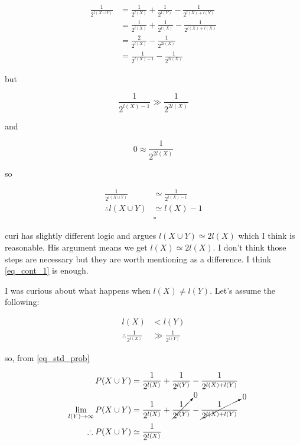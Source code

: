 \documentclass{article}
\begin{document}
\begin{equation}
    \begin{split}
        \frac{1}{2^{l(X\cup Y)}} & = \frac{1}{2^{l(X)}} + \frac{1}{2^{l(Y)}} - \frac{1}{2^{l(X) + l(Y)}} \\
        & = \frac{1}{2^{l(X)}} + \frac{1}{2^{l(X)}} - \frac{1}{2^{l(X) + l(X)}} \\
        & = \frac{2}{2^{l(X)}} - \frac{1}{2^{2l(X)}} \\
        & = \frac{1}{2^{l(X)-1}} - \frac{1}{2^{2l(X)}}
    \end{split}
\end{equation}

but

\begin{equation}
\frac{1}{2^{l(X)-1}} \gg \frac{1}{2^{2l(X)}}
\end{equation}

and

\begin{equation}
0 \approx \frac{1}{2^{2l(X)}}
\end{equation}

so

\begin{equation} \label{eq_cont_1}
\begin{split}
\frac{1}{2^{l(X\cup Y)}} & \simeq \frac{1}{2^{l(X)-1}} \\
\therefore l(X\cup Y) & \simeq l(X)-1 \\
& \square
\end{split}
\end{equation}

curi has slightly different logic and argues \(l(X\cup Y) \simeq 2l(X)\) which I think is reasonable. His argument means we get \(l(X) \simeq 2l(X)\). I don't think those steps are necessary but they are worth mentioning as a difference. I think \cref{eq_cont_1} is enough.

I was curious about what happens when \(l(X) \neq l(Y)\). Let's assume the following:

\begin{equation} \label{eq_len_ineq}
\begin{split}
l(X) & < l(Y) \\
\therefore \frac{1}{2^{l(X)}} & \gg \frac{1}{2^{l(Y)}}
\end{split}
\end{equation}

so, from \cref{eq_std_prob}

\begin{equation} \label{eq_or_ineq}
    \begin{split}
P(X\cup Y) & = \frac{1}{2^{l(X)}} + \frac{1}{2^{l(Y)}} - \frac{1}{2^{l(X) + l(Y)}} \\
\lim_{l(Y) \to \infty} P(X\cup Y) & = \frac{1}{2^{l(X)}} + \cancelto{0}{\frac{1}{2^{l(Y)}}} - \cancelto{0}{\frac{1}{2^{l(X) + l(Y)}}} \\
\therefore P(X\cup Y) & \simeq \frac{1}{2^{l(X)}}
    \end{split}
\end{equation}
\end{document}
